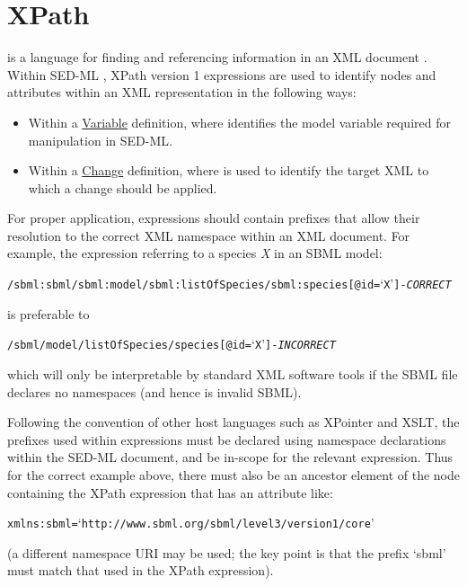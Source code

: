 \section{XPath}  
\label{sec:xpath}
 is a language for finding and referencing information in an XML document \citep{xpath:1999}. Within SED-ML \currentLV, XPath version 1 expressions are used to identify nodes and attributes within an XML representation in the following ways:

\begin{itemize}
	\item {Within a \hyperref[class:variable]{Variable} definition, where  identifies the model variable required for manipulation in SED-ML.}
	\item {Within a \hyperref[class:change]{Change} definition, where  is used to identify the target XML to which a change should be applied.}
\end{itemize}

For proper application,  expressions should contain prefixes that allow their resolution to the correct XML namespace within an XML document. For example, the  expression referring to a species \emph{X} in an SBML model:
\begin{alltt}
/sbml:sbml/sbml:model/sbml:listOfSpecies/sbml:species[@id=`X'] {\tickYes -\emph{CORRECT}}
\end{alltt}
is preferable to 
\begin{alltt}
/sbml/model/listOfSpecies/species[@id=`X'] {\tickNo -\emph{INCORRECT} }
\end{alltt}

which will only be interpretable by standard XML software tools if the SBML file declares no namespaces (and hence is invalid SBML).

Following the convention of other  host languages such as XPointer and XSLT, the prefixes used within  expressions must be declared using namespace declarations within the SED-ML document, and be in-scope for the relevant expression. Thus for the correct example above, there must also be an ancestor element of the node containing the XPath expression that has an attribute like:
\begin{alltt}
xmlns:sbml=`http://www.sbml.org/sbml/level3/version1/core'
\end{alltt}
(a different namespace URI may be used; the key point is that the prefix `sbml' must match that used in the XPath expression).


